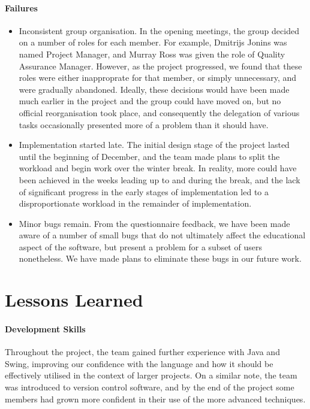 \paragraph{Failures}
\begin{itemize}
\item Inconsistent group organisation. In the opening meetings, the group decided on
  a number of roles for each member. For example, Dmitrijs Jonins was named Project 
  Manager, and Murray Ross was given the role of Quality Assurance Manager. However,
  as the project progressed, we found that these roles were either inapproprate for
  that member, or simply unnecessary, and were gradually abandoned. Ideally, these
  decisions would have been made much earlier in the project and the group could have
  moved on, but no official reorganisation took place, and consequently the delegation
  of various tasks occasionally presented more of a problem than it should have.  

\item Implementation started late. The initial design stage of the project lasted until
  the beginning of December, and the team made plans to split the workload and begin work
  over the winter break. In reality, more could have been achieved in the weeks leading up
  to and during the break, and the lack of significant progress in the early stages of 
  implementation led to a disproportionate workload in the remainder of implementation.

\item Minor bugs remain. From the questionnaire feedback, we have been made aware of
  a number of small bugs that do not ultimately affect the educational aspect of the
  software, but present a problem for a subset of users nonetheless. We have made plans
  to eliminate these bugs in our future work. 

\end{itemize}

\section{Lessons Learned}
\paragraph{Development Skills}
Throughout the project, the team gained further experience with Java and Swing, improving
our confidence with the language and how it should be effectively utilised in the context
of larger projects. On a similar note, the team was introduced to version control software, 
and by the end of the project some members had grown more confident in their use of the 
more advanced techniques.
  
